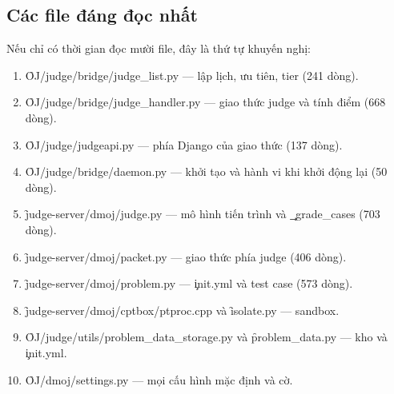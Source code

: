 \subsection{Các file đáng đọc nhất}
Nếu chỉ có thời gian đọc mười file, đây là thứ tự khuyến nghị:
\begin{enumerate}
\item \f{OJ/judge/bridge/judge_list.py} --- lập lịch, ưu tiên, tier (241 dòng).
\item \f{OJ/judge/bridge/judge_handler.py} --- giao thức judge và tính điểm (668 dòng).
\item \f{OJ/judge/judgeapi.py} --- phía Django của giao thức (137 dòng).
\item \f{OJ/judge/bridge/daemon.py} --- khởi tạo và hành vi khi khởi động lại (50 dòng).
\item \f{judge-server/dmoj/judge.py} --- mô hình tiến trình và \c{_grade_cases} (703 dòng).
\item \f{judge-server/dmoj/packet.py} --- giao thức phía judge (406 dòng).
\item \f{judge-server/dmoj/problem.py} --- \c{init.yml} và test case (573 dòng).
\item \f{judge-server/dmoj/cptbox/ptproc.cpp} và \f{isolate.py} --- sandbox.
\item \f{OJ/judge/utils/problem_data_storage.py} và \f{problem_data.py} --- kho và \c{init.yml}.
\item \f{OJ/dmoj/settings.py} --- mọi cấu hình mặc định và cờ.
\end{enumerate}
